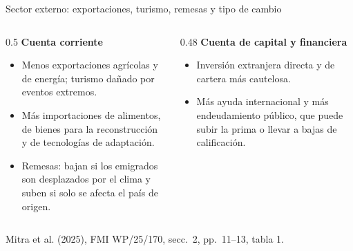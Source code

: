 \documentclass[aspectratio=169,11pt]{beamer}
\newcommand{\fuente}[1]{\par\vfill{\small\color{cGris}#1\par}}
\newcommand{\FMI}{Mitra et al. (2025), FMI WP/25/170}
\begin{document}
\begin{frame}{Sector externo: exportaciones, turismo, remesas y tipo de cambio}
  \small
  \begin{columns}[T]
    \begin{column}{0.5\textwidth}
      \textbf{Cuenta corriente}
      \begin{itemize}
        \item<1-> Menos exportaciones agrícolas y de energía; turismo dañado por eventos extremos.
        \item<1-> Más importaciones de alimentos, de bienes para la reconstrucción y de tecnologías de adaptación.
        \item<2-> Remesas: bajan si los emigrados son desplazados por el clima y suben si solo se afecta el país de origen.
      \end{itemize}
    \end{column}
    \begin{column}{0.48\textwidth}
      \textbf{Cuenta de capital y financiera}
      \begin{itemize}
        \item<3-> Inversión extranjera directa y de cartera más cautelosa.
        \item<3-> Más ayuda internacional y más endeudamiento público, que puede subir la prima o llevar a bajas de calificación.
      \end{itemize}
    \end{column}
  \end{columns}
  \medskip
  \fuente{\FMI, secc.~2, pp.~11--13, tabla 1.}
\end{frame}
\end{document}
